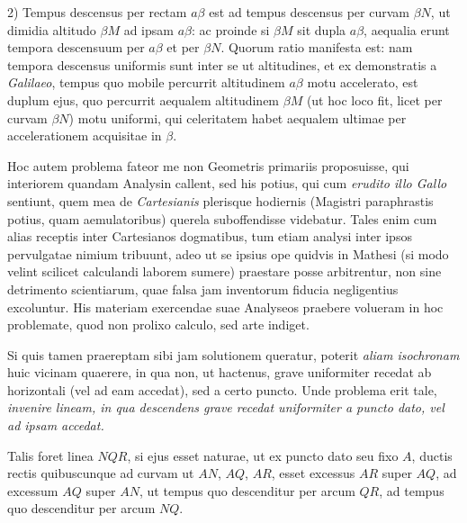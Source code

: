 \documentclass{article}
\begin{document}
2) Tempus descensus per rectam $a\beta$ est ad tempus descensus per curvam $\beta N$, ut dimidia
altitudo $\beta M$ ad ipsam $a\beta$: ac proinde si $\beta M$ sit dupla $a\beta$, aequalia erunt
tempora descensuum per $a\beta$ et per $\beta N$. Quorum ratio manifesta est: nam tempora descensus
uniformis sunt inter se ut altitudines, et ex demonstratis a \emph{Galilaeo}, tempus quo mobile
percurrit altitudinem $a\beta$ motu accelerato, est duplum ejus, quo percurrit aequalem altitudinem
$\beta M$ (ut hoc loco fit, licet per curvam $\beta N$) motu uniformi, qui celeritatem habet
aequalem ultimae per accelerationem acquisitae in $\beta$.

Hoc autem problema fateor me non Geometris primariis proposuisse, qui interiorem quandam Analysin
callent, sed his potius, qui cum \emph{erudito illo Gallo} sentiunt, quem mea de \emph{Cartesianis}
plerisque hodiernis (Magistri paraphrastis potius, quam aemulatoribus) querela suboffendisse
videbatur. Tales enim cum alias receptis inter Cartesianos dogmatibus, tum etiam analysi inter
ipsos pervulgatae nimium tribuunt, adeo ut se ipsius ope quidvis in Mathesi
(si modo velint scilicet calculandi laborem sumere) praestare posse arbitrentur, non sine
detrimento scientiarum, quae falsa jam inventorum fiducia negligentius excoluntur. His materiam
exercendae suae Analyseos praebere volueram in hoc problemate, quod non prolixo calculo, sed arte
indiget.

Si quis tamen praereptam sibi jam solutionem queratur, poterit \emph{aliam isochronam} huic
vicinam quaerere, in qua non, ut hactenus, grave uniformiter recedat ab horizontali (vel ad eam
accedat), sed a certo puncto. Unde problema erit tale, \emph{invenire lineam, in qua descendens
grave recedat uniformiter a puncto dato, vel ad ipsam accedat.}

Talis foret linea $NQR$, si ejus esset naturae, ut ex puncto dato seu fixo $A$, ductis rectis
quibuscunque ad curvam ut $AN$, $AQ$, $AR$, esset excessus $AR$ super $AQ$, ad excessum $AQ$ super
$AN$, ut tempus quo descenditur per arcum $QR$, ad tempus quo descenditur per arcum $NQ$.
\end{document}
